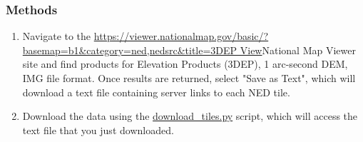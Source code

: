 \subsubsection*{Methods}
\begin{enumerate}
\item Navigate to the \url{https://viewer.nationalmap.gov/basic/?basemap=b1&category=ned,nedsrc&title=3DEP View}{National Map Viewer} site and find products for Elevation Products (3DEP), 1 arc-second DEM, IMG file format. Once results are returned, select "Save as Text", which will download a text file containing server links to each NED tile.

\item Download the data using the \href{https://github.com/earthlab/estimate-pm25/blob/master/download-earth-observations/NED/download_tiles.py}{download\_tiles.py} script, which will access the text file that you just downloaded. 


\end{enumerate}
